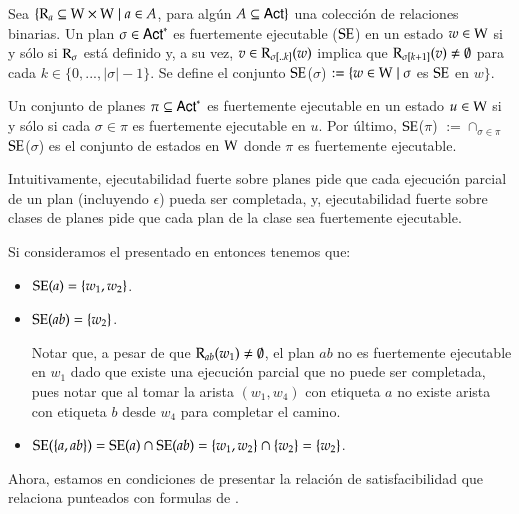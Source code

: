 \begin{definicion}
    Sea $\{\mathrm{R}_a \subseteq \mathrm{W} \times \mathrm{W} \mid a \in A$, para algún $A \subseteq {\rm \sf Act}\}$ una colección de relaciones binarias. Un plan $\sigma \in {\rm \sf Act}^*$
    es fuertemente ejecutable ($\mathrm{SE}$) en un estado $w \in \mathrm{W}$ si y sólo si $\mathrm{R}_\sigma$ está definido y, a su vez, $v \in \mathrm{R}_{\sigma[..k]}(w)$ implica que 
    $\mathrm{R}_{\sigma[k+1]}(v) \neq \emptyset$ para cada $k \in \{0,...,|\sigma|-1\}$. Se define el conjunto $\mathrm{SE}$($\sigma$) $:= \{w \in \mathrm{W} \mid \sigma$ es $\mathrm{SE}$ en $w\}$.
    
    Un conjunto de planes $\pi \subseteq {\rm \sf Act}^*$ es fuertemente ejecutable en un estado $u \in \mathrm{W}$ si y sólo si cada $\sigma \in \pi$ es fuertemente ejecutable en $u$.
    Por último, $\mathrm{SE}$($\pi$) $:= \cap_{\sigma \in \pi}$ $\mathrm{SE}$($\sigma$) es el conjunto de estados en $\mathrm{W}$ donde $\pi$ es fuertemente ejecutable. 
\end{definicion}

Intuitivamente, ejecutabilidad fuerte sobre planes pide que cada ejecución parcial de un plan (incluyendo $\epsilon$) pueda ser completada, y, ejecutabilidad fuerte sobre
clases de planes pide que cada plan de la clase sea fuertemente ejecutable.

\begin{ejemplo}
    Si consideramos el \ults presentado en  entonces tenemos que:
    \begin{itemize}
        \item $\mathrm{SE}(a) = \{w_1,w_2\}$.
        \item $\mathrm{SE}(ab) = \{w_2\}$.

        Notar que, a pesar de que $\mathrm{R}_{ab}(w_1) \neq \emptyset$, el plan $ab$ no es fuertemente ejecutable en $w_1$ 
        dado que existe una ejecución parcial que no puede ser completada, pues notar que al tomar la arista 
        $(w_1,w_4)$ con etiqueta $a$ no existe arista con etiqueta $b$ desde $w_4$ para completar el camino.

        \item $\mathrm{SE}(\{a,ab\}) = \mathrm{SE}(a) \cap \mathrm{SE}(ab) = \{w_1,w_2\} \cap \{w_2\} = \{w_2\}$.
    \end{itemize}
\end{ejemplo}

Ahora, estamos en condiciones de presentar la relación de satisfacibilidad que relaciona \ultss punteados con formulas de \KHilogic. 

